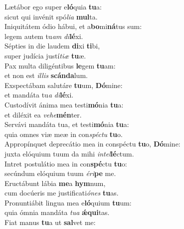 \evenverse Lætábor ego super e\textbf{ló}quia \textbf{tu}a:~\*\\
\evenverse sicut qui invénit spó\textit{li}\textit{a} \textbf{mul}ta.\\
\oddverse Iniquitátem ódio hábui, et a\textbf{bo}mi\textbf{ná}tus sum:~\*\\
\oddverse legem autem tu\textit{am} \textit{di}\textbf{lé}xi.\\
\evenverse Sépties in die laudem \textbf{di}xi \textbf{ti}bi,~\*\\
\evenverse super judícia justí\textit{ti}\textit{æ} \textbf{tu}æ.\\
\oddverse Pax multa diligéntibus \textbf{le}gem \textbf{tu}am:~\*\\
\oddverse et non est \textit{il}\textit{lis} \textbf{scán}\textbf{da}lum.\\
\evenverse Exspectábam salutáre \textbf{tu}um, \textbf{Dó}mine:~\*\\
\evenverse et mandáta tu\textit{a} \textit{di}\textbf{lé}xi.\\
\oddverse Custodívit ánima mea testi\textbf{mó}nia \textbf{tu}a:~\*\\
\oddverse et diléxit ea \textit{ve}\textit{he}\textbf{mén}ter.\\
\evenverse Servávi mandáta tua, et testi\textbf{mó}nia \textbf{tu}a:~\*\\
\evenverse quia omnes viæ meæ in con\textit{spé}\textit{ctu} \textbf{tu}o.\\
\oddverse Appropínquet deprecátio mea in conspéctu \textbf{tu}o, \textbf{Dó}mine:~\*\\
\oddverse juxta elóquium tuum da mihi \textit{in}\textit{tel}\textbf{lé}ctum.\\
\evenverse Intret postulátio mea in con\textbf{spé}ctu \textbf{tu}o:~\*\\
\evenverse secúndum elóquium tuum \textit{é}\textit{ri}\textbf{pe} me.\\
\oddverse Eructábunt lábia \textbf{me}a \textbf{hym}num,~\*\\
\oddverse cum docúeris me justificati\textit{ó}\textit{nes} \textbf{tu}as.\\
\evenverse Pronuntiábit lingua mea e\textbf{ló}quium \textbf{tu}um:~\*\\
\evenverse quia ómnia mandáta \textit{tu}\textit{a} \textbf{ǽ}\textbf{qui}tas.\\
\oddverse Fiat manus \textbf{tu}a ut \textbf{sal}vet me:~\*\\
